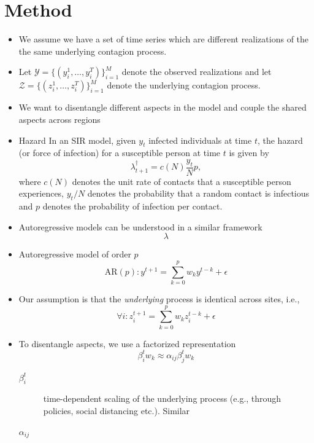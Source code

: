 \documentclass{article}
\newcommand{\Set}[1]{\mathcal{#1}}
\begin{document}
\section{Method}
\label{sec:org51a8bb1}
\begin{itemize}
\item We assume we have a set of time series which are different realizations of the
the same underlying contagion process.
\item Let \(\Set{Y} = \{(y_i^1, \ldots, y_i^T)\}_{i=1}^M\) denote the observed
realizations and let \(\Set{Z} = \{(z_i^1, \ldots, z_i^T)\}_{i=1}^M\) denote the
underlying contagion process.
\item We want to disentangle different aspects in the model and couple the shared
aspects across regions
\item Hazard
In an SIR model, given \(y_t\) infected individuals at time \(t\), the hazard (or
force of infection) for a susceptible person at time \(t\) is given by
\[
  \lambda^\dagger_{t+1} = c(N) \frac{y_t}{N} p,
  \]
where \(c(N)\) denotes the unit rate of contacts that a susceptible person
experiences, \(y_t/N\) denotes the probability that a random contact is
infectious and
\(p\) denotes the probability of infection per contact.
\item Autoregressive models can be understood in a similar framework
\begin{equation*}
  \lambda
\end{equation*}
\item Autoregressive model of order \(p\)
\begin{equation}
  \text{AR}(p): y^{t+1} = \sum_{k=0}^p w_k y^{t-k} + \epsilon
\end{equation}
\item Our assumption is that the \emph{underlying} process is identical across sites,
i.e.,
\begin{equation}
  \forall i: z_i^{t+1} = \sum_{k=0}^p w_k z_i^{t-k} + \epsilon
\end{equation}
\item To disentangle aspects, we use a factorized representation
\begin{equation}
\beta_i^t w_k \approx \alpha_{ij }\beta_j^t w_k
\end{equation}

\begin{description}
\item[{\(\beta_i^t\)}] time-dependent scaling of the underlying process (e.g.,
through policies, social distancing etc.). Similar
\item[{\(\alpha_{ij}\)}] 
\end{description}
\end{itemize}
\end{document}
